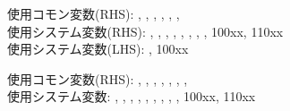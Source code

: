 \clearpage

\begin{hosoku}\small
使用コモン変数(RHS): , , , , , , \\
使用システム変数(RHS): , , , , , , , , \ttNum100xx, \ttNum110xx\\
使用システム変数(LHS): , \ttNum100xx
\end{hosoku}


\clearpage

\begin{hosoku}\small
使用コモン変数(RHS): , , , , , , , \\
使用システム変数: , , , , , , , , , \ttNum100xx, \ttNum110xx
\end{hosoku}


